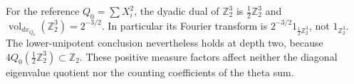 For the reference $Q_0=\sum X_i^2$, the dyadic dual of
$\mathbb Z_2^3$ is $\tfrac12\mathbb Z_2^3$ and
$\operatorname{vol}_{dx_{Q_0}}(\mathbb Z_2^3)=2^{-3/2}$.
In particular its Fourier transform is
$2^{-3/2}1_{\frac12\mathbb Z_2^3}$, not $1_{\mathbb Z_2^3}$.
The lower-unipotent conclusion nevertheless holds at depth two,
because $4Q_0(\frac12\mathbb Z_2^3)\subset\mathbb Z_2$.
These positive measure factors affect neither the diagonal
eigenvalue quotient nor the counting coefficients of the theta sum.


